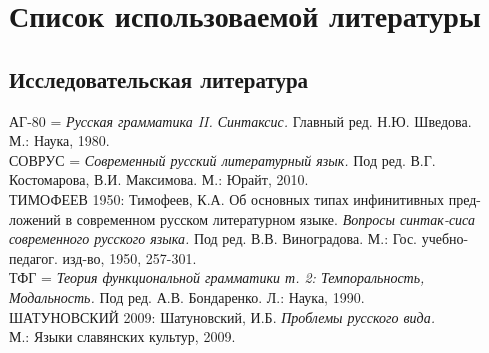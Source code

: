 \section*{Список использоваемой литературы}
\setlength{\parindent}{0cm}
\begin{normalsize}
\subsection*{Исследовательская литература}
АГ-80 = \textit{Русская грамматика II. Синтаксис.} Главный ред. Н.Ю. Шведова.\\\hspace*{4ex}М.: Наука, 1980.\\
СОВРУС = \textit{Современный русский литературный язык.} Под ред. В.Г.\\\hspace*{4ex}Костомарова, В.И. Максимова. М.: Юрайт, 2010.\\
ТИМОФЕЕВ 1950: Тимофеев, К.А. Об основных типах инфинитивных пред-\hspace*{4ex}ложений в современном русском литературном языке. \textit{Вопросы синтак-\hspace*{4ex}сиса современного русского языка.} Под ред. В.В. Виноградова. М.: Гос. \hspace*{4ex}учебно-педагог. изд-во, 1950, 257-301.\\
ТФГ = \textit{Теория функциональной грамматики т. 2: Темпоральность, \\\hspace*{4ex}Модальность.} Под ред. А.В. Бондаренко. Л.: Наука, 1990.\\
ШАТУНОВСКИЙ 2009: Шатуновский, И.Б. \textit{Проблемы русского вида.} \\\hspace*{4ex}М.: Языки славянских культур, 2009. 



\end{normalsize}